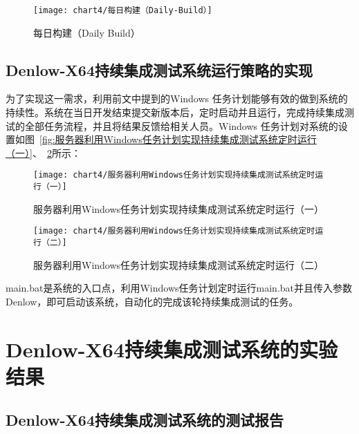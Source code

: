 		\begin{figure}[H] %
			\centering
			\texttt{[image: chart4/每日构建（Daily-Build）]}
			\caption{每日构建（Daily Build）}
			\label{fig:每日构建（Daily-Build）}
		\end{figure}
		
	\subsection{Denlow-X64持续集成测试系统运行策略的实现}
		
		为了实现这一需求，利用前文中提到的Windows 任务计划能够有效的做到系统的持续性。系统在当日开发结束提交新版本后，定时启动并且运行，完成持续集成测试的全部任务流程，并且将结果反馈给相关人员。Windows 任务计划对系统的设置如图~\ref{fig:服务器利用Windows任务计划实现持续集成测试系统定时运行（一）}、~\ref{fig:服务器利用Windows任务计划实现持续集成测试系统定时运行（二）}所示：
		
		\begin{figure}[H]
			\begin{minipage}{0.48\textwidth}
			  \centering
			  \texttt{[image: chart4/服务器利用Windows任务计划实现持续集成测试系统定时运行（一）]}
			  \caption{服务器利用Windows任务计划实现持续集成测试系统定时运行（一）}
			  \label{fig:服务器利用Windows任务计划实现持续集成测试系统定时运行（一）}
			\end{minipage}\hfill
			\begin{minipage}{0.48\textwidth}
			  \centering
			  \texttt{[image: chart4/服务器利用Windows任务计划实现持续集成测试系统定时运行（二）]}
			  \caption{服务器利用Windows任务计划实现持续集成测试系统定时运行（二）}
			  \label{fig:服务器利用Windows任务计划实现持续集成测试系统定时运行（二）}
			\end{minipage}
		\end{figure}
		
		main.bat是系统的入口点，利用Windows任务计划定时运行main.bat并且传入参数Denlow，即可启动该系统，自动化的完成该轮持续集成测试的任务。
			
\section{Denlow-X64持续集成测试系统的实验结果}
	\subsection{Denlow-X64持续集成测试系统的测试报告}
		
